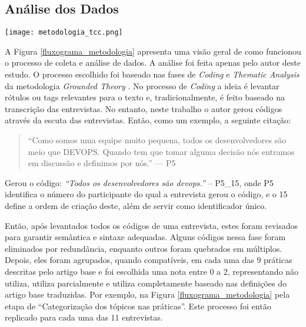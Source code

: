 \subsection{Análise dos Dados}

\begin{figure*}[ht]
\begin{center}
\texttt{[image: metodologia\_tcc.png]}
\end{center}
\caption[Fluxograma da Metodologia]{
    Visão geral dos processos de coleta e análise de dados.
}\label{fluxograma_metodologia}
\end{figure*}

    
A Figura \ref{fluxograma_metodologia} apresenta uma visão geral de como funcionou o processo de coleta e análise de dados. A análise foi feita apenas pelo autor deste estudo. O processo escolhido foi baseado nas fases de \emph{Coding} e \emph{Thematic Analysis} da metodologia \emph{Grounded Theory} \cite{groundedTheory}. No processo de \emph{Coding} a ideia é levantar rótulos ou tags relevantes para o texto e, tradicionalmente, é feito baseado na transcrição das entrevistas. No entanto, neste trabalho o autor gerou códigos através da escuta das entrevistas. Então, como um exemplo, a seguinte citação:

\begin{quote}
    ``Como somos uma equipe muito pequena, todos os desenvolvedores são meio que DEVOPS. Quando tem que tomar alguma decisão nós entramos em discussão e definimos por nós.'' --- P5
\end{quote}

Gerou o código: \emph{``Todos os desenvolvedores são devops.''} -- P5\_15, onde P5 identifica o número do participante do qual a entrevista gerou o código, e o 15 define a ordem de criação deste, além de servir como identificador único.

Então, após levantados todos os códigos de uma entrevista, estes foram revisados para garantir semântica e sintaxe adequadas. Alguns códigos nessa fase foram eliminados por redundância, enquanto outros foram quebrados em múltiplos. Depois, eles foram agrupados, quando compatíveis, em cada uma das 9 práticas descritas pelo artigo base e foi escolhida uma nota entre 0 a 2, representando não utiliza, utiliza parcialmente e utiliza completamente baseado nas definições do artigo base traduzidas. Por exemplo, na Figura \ref{fluxograma_metodologia} pela etapa de ``Categorização dos tópicos nas práticas''. Este processo foi então replicado para cada uma das 11 entrevistas.

